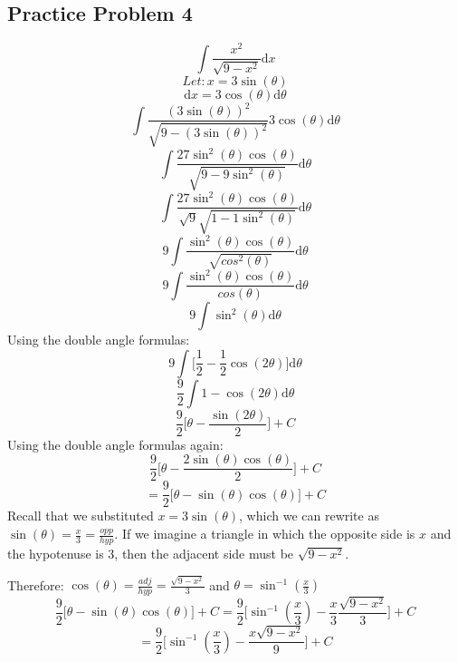 \documentclass[letterpaper, 12pt]{article}
\renewcommand*{\arcsin}{\sin^{-1}}
\newcommand*{\diff}{\mathrm{d}}
\begin{document}
\subsection*{Practice Problem 4}
\[ \int{\frac{x^{2}}{\sqrt{9-x^{2}}}\diff{x}} \]
\[ Let: x = 3\sin(\theta) \]
\[ \diff{x} = 3\cos(\theta)\diff{\theta} \]
\[ \int{\frac{(3\sin(\theta))^{2}}
   {\sqrt{9-(3\sin(\theta))^{2}}}3\cos(\theta)\diff{\theta}} \]
\[ \int{\frac{27\sin^{2}(\theta)\cos(\theta)}
   {\sqrt{9-9\sin^{2}(\theta)}}\diff{\theta}} \]
\[ \int{\frac{27\sin^{2}(\theta)\cos(\theta)}
   {\sqrt{9}\sqrt{1-1\sin^{2}(\theta)}}\diff{\theta}} \]
\[ 9\int{\frac{\sin^{2}(\theta)\cos(\theta)}
   {\sqrt{cos^{2}(\theta)}}\diff{\theta}} \]
\[ 9\int{\frac{\sin^{2}(\theta)\cos(\theta)}{cos(\theta)}\diff{\theta}} \]
\[ 9\int{\sin^{2}(\theta)\diff{\theta}} \]
Using the double angle formulas:
\[ 9\int{\bigg[\frac{1}{2}-\frac{1}{2}\cos(2\theta)\bigg]\diff{\theta}} \]
\[ \frac{9}{2}\int{1-\cos(2\theta)\diff{\theta}} \]
\[ \frac{9}{2}\bigg[\theta-\frac{\sin(2\theta)}{2}\bigg]+C \]
Using the double angle formulas again:
\[ \frac{9}{2}\bigg[\theta-\frac{2\sin(\theta)\cos(\theta)}{2}\bigg]+C \]
\[ = \frac{9}{2}\bigg[\theta-\sin(\theta)\cos(\theta)\bigg]+C \]
Recall that we substituted \( x = 3\sin(\theta) \), which we can rewrite as
\( \sin(\theta) = \frac{x}{3} = \frac{opp}{hyp} \). If we imagine a triangle in
which the opposite side is \( x \) and the hypotenuse is 3, then the adjacent
side must be \( \sqrt{9-x^{2}} \).
\begin{center}
\end{center}
Therefore: \( \cos(\theta) = \frac{adj}{hyp} = \frac{\sqrt{9-x^{2}}}{3} \) and
\( \theta = \arcsin(\frac{x}{3}) \)
\[ \frac{9}{2}\bigg[\theta-\sin(\theta)\cos(\theta)\bigg]+C =
   \frac{9}{2}\bigg[\arcsin(\frac{x}{3})-
   \frac{x}{3}\frac{\sqrt{9-x^{2}}}{3}\bigg]+C \]
\[ = \frac{9}{2}\bigg[\arcsin(\frac{x}{3})-
   \frac{x\sqrt{9-x^{2}}}{9}\bigg]+C \]
\end{document}
